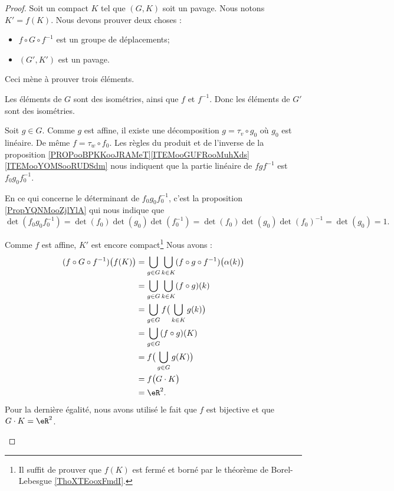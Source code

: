\begin{proof}
	Soit un compact \( K\) tel que \( (G,K)\) soit un pavage. Nous notons \( K'=f(K)\). Nous devons prouver deux choses :
	\begin{itemize}
		\item \( f\circ G\circ f^{-1}\) est un groupe de déplacements;
		\item \( (G',K')\) est un pavage.
	\end{itemize}

	Ceci mène à prouver trois éléments.
	\begin{subproof}
		Les éléments de \( G\) sont des isométries, ainsi que \( f\) et \( f^{-1}\). Donc les éléments de \( G'\) sont des isométries.

		Soit \( g\in G\). Comme \( g\) est affine, il existe une décomposition \( g=\tau_v\circ g_0\) où \( g_0\) est linéaire. De même \( f=\tau_w\circ f_0\). Les règles du produit et de l'inverse de la proposition \ref{PROPooBPKKooJRAMeT}\ref{ITEMooGUFRooMuhXds}\ref{ITEMooYOMSooRUDSdm} nous indiquent que la partie linéaire de \( fgf^{-1}\) est \( f_0g_0f_0^{-1}\).

		En ce qui concerne le déterminant de \( f_0g_0f_0^{-1}\), c'est la proposition \ref{PropYQNMooZjlYlA} qui nous indique que
		\begin{equation}
			\det(f_0g_0f_0^{-1})=\det(f_0)\det(g_0)\det(f_0^{-1})=\det(f_0)\det(g_0)\det(f_0)^{-1}=\det(g_0)=1.
		\end{equation}

		\spitem[\( G'\cdot K'=\eR^2\)]
		Comme \( f\) est affine, \( K'\) est encore compact\footnote{Il suffit de prouver que \( f(K)\) est fermé et borné par le théorème de Borel-Lebesgue \ref{ThoXTEooxFmdI}.} Nous avons :
		\begin{subequations}
			\begin{align}
				(f\circ G\circ f^{-1})\big( f(K) \big) & =\bigcup_{g\in G}\bigcup_{k\in K}(f\circ g\circ f^{-1})\big( \alpha(k) \big) \\
				                                       & =\bigcup_{g\in G}\bigcup_{k\in K}(f\circ g)(k)                               \\
				                                       & =\bigcup_{g\in G}f\big( \bigcup_{k\in K}g(k) \big)                           \\
				                                       & =\bigcup_{g\in G}(f\circ g)(K)                                               \\
				                                       & =f\big( \bigcup_{g\in G}g(K) \big)                                           \\
				                                       & =f\big( G\cdot K \big)                                                       \\
				                                       & =\eR^2.
			\end{align}
		\end{subequations}
		Pour la dernière égalité, nous avons utilisé le fait que \( f\) est bijective et que \( G\cdot K=\eR^2\).


\end{subproof}
\end{proof}
